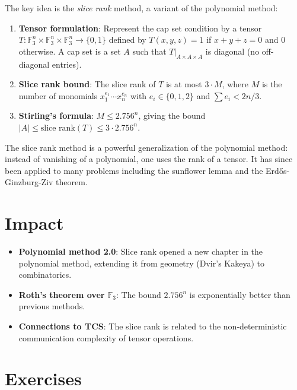 The key idea is the \emph{slice rank} method, a variant of the polynomial method:

\begin{enumerate}
\item \textbf{Tensor formulation}: Represent the cap set condition by a tensor $T: \mathbb{F}_3^n \times \mathbb{F}_3^n \times \mathbb{F}_3^n \to \{0,1\}$ defined by $T(x,y,z) = 1$ if $x + y + z = 0$ and $0$ otherwise. A cap set is a set $A$ such that $T|_{A \times A \times A}$ is diagonal (no off-diagonal entries).

\item \textbf{Slice rank bound}: The slice rank of $T$ is at most $3 \cdot M$, where $M$ is the number of monomials $x_1^{e_1} \cdots x_n^{e_n}$ with $e_i \in \{0,1,2\}$ and $\sum e_i < 2n/3$.

\item \textbf{Stirling's formula}: $M \le 2.756^n$, giving the bound $|A| \le \text{slice rank}(T) \le 3 \cdot 2.756^n$.
\end{enumerate}

\begin{highlightbox}
The slice rank method is a powerful generalization of the polynomial method: instead of vanishing of a polynomial, one uses the rank of a tensor. It has since been applied to many problems including the sunflower lemma and the Erd\H{o}s-Ginzburg-Ziv theorem.
\end{highlightbox}

\section{Impact}
\begin{itemize}
\item \textbf{Polynomial method 2.0}: Slice rank opened a new chapter in the polynomial method, extending it from geometry (Dvir's Kakeya) to combinatorics.
\item \textbf{Roth's theorem over $\mathbb{F}_3$}: The bound $2.756^n$ is exponentially better than previous methods.
\item \textbf{Connections to TCS}: The slice rank is related to the non-deterministic communication complexity of tensor operations.
\end{itemize}

\section{Exercises}


